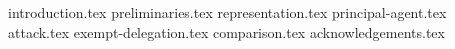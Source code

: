 {introduction.tex}
{preliminaries.tex}
{representation.tex}
{principal-agent.tex}
{attack.tex}
{exempt-delegation.tex}
{comparison.tex}
\ifanonymous\else
{acknowledgements.tex}
\fi
